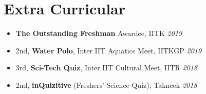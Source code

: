 \section*{\sc Extra Curricular}
\vspace{-2mm}
\hrulefill
\vspace{1mm}

\begin{itemize}
 \item \textbf{The Outstanding Freshman} Awardee, IITK \hfill \textit{2019}
 \item 2nd, \textbf{Water Polo}, Inter IIT Aquatics Meet, IITKGP \hfill \textit{2019}
 \item 3rd, \textbf{Sci-Tech Quiz}, Inter IIT Cultural Meet, IITR \hfill \textit{2018}
 \item 2nd, \textbf{inQuizitive} (Freshers' Science Quiz), Takneek \hfill \textit{2018}
\end{itemize}
